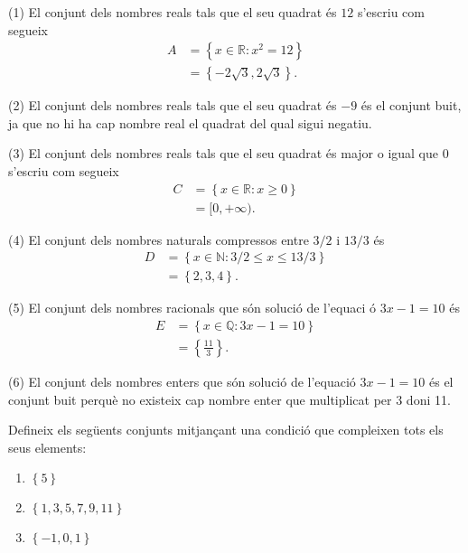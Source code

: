 \begin{solucio}
(1) El conjunt dels nombres reals tals que el seu quadrat \'{e}s $12$
s'escriu com segueix%
\begin{align*}
A& =\left\{ x\in \mathbb{R}:x^{2}=12\right\} \\
& =\left\{ -2\sqrt{3},2\sqrt{3}\right\} \text{.}
\end{align*}

(2) El conjunt dels nombres reals tals que el seu quadrat \'{e}s $-9$ \'{e}s
el conjunt buit, ja que no hi ha cap nombre real el quadrat del qual sigui
negatiu.

(3) El conjunt dels nombres reals tals que el seu quadrat \'{e}s major o
igual que $0$ s'escriu com segueix%
\begin{align*}
C& =\left\{ x\in \mathbb{R}:x\geq 0\right\} \\
& =[0,+\infty )\text{.}
\end{align*}

(4) El conjunt dels nombres naturals compressos entre $3/2$ i $13/3$ \'{e}s%
\begin{align*}
D& =\left\{ x\in \mathbb{N}:3/2\leq x\leq 13/3\right\} \\
& =\left\{ 2,3,4\right\} \text{.}
\end{align*}

(5) El conjunt dels nombres racionals que s\'{o}n soluci\'{o} de l'equaci%
\'{o} $3x-1=10$ \'{e}s%
\begin{align*}
E& =\left\{ x\in \mathbb{Q}:3x-1=10\right\} \\
& =\left\{ \frac{11}{3}\right\} \text{.}
\end{align*}

(6) El conjunt dels nombres enters que s\'{o}n soluci\'{o} de l'equaci\'{o} $%
3x-1=10$ \'{e}s el conjunt buit perqu\`{e} no existeix cap nombre enter que
multiplicat per $3$ doni 11.
\end{solucio}

\begin{exer}
Defineix els seg\"{u}ents conjunts mitjan\c{c}ant una condici\'{o} que
compleixen tots els seus elements:

\begin{enumerate}
\item $\left\{ 5\right\} $

\item $\left\{ 1,3,5,7,9,11\right\} $

\item $\left\{ -1,0,1\right\} $
\end{enumerate}
\end{exer}

